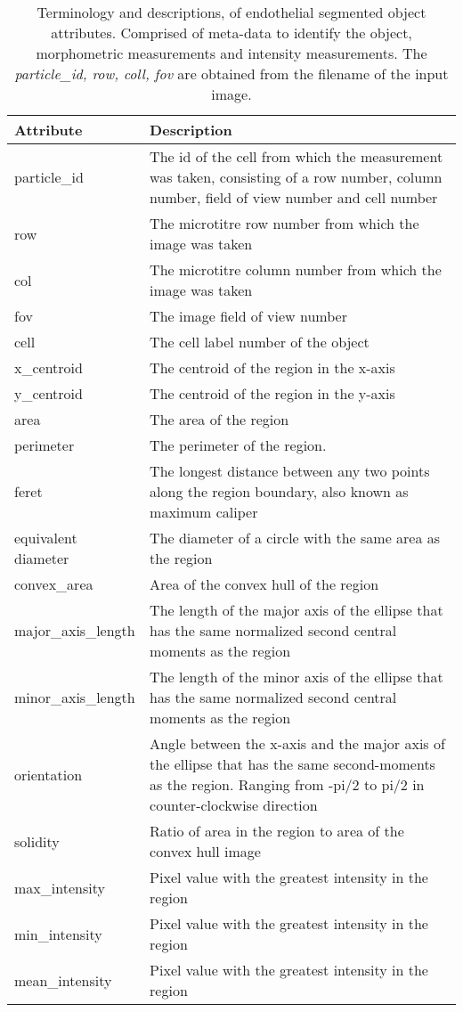 \begin{table}[htbp]
\caption[Endothelial morphometry segmented region attributes and properties]{Terminology and descriptions, of endothelial segmented object attributes. Comprised of meta-data to identify the object, morphometric measurements and intensity measurements. The \emph{particle\_id, row, coll, fov} are obtained from the filename of the input image.}
\centering
\label{table:endothelial_morphometry:region_properties}
\begin{tabular}{p{4cm} p{10cm}}
    \toprule
    Attribute  & Description \\
    \midrule
    particle\_id        & The id of the cell from which the measurement was taken, consisting of a row number, column number, field of view number and cell number \\
    row                 & The microtitre row number from which the image was taken \\
    col                 & The microtitre column number from which the image was taken \\
    fov                 & The image field of view number \\
    cell                & The cell label number of the object \\
    x\_centroid         & The centroid of the region in the x-axis \\
    y\_centroid         & The centroid of the region in the y-axis \\
    area                & The area of the region \\
    perimeter           & The perimeter of the region. \\
    feret               & The longest distance between any two points along the region boundary, also known as maximum caliper \\
    equivalent diameter & The diameter of a circle with the same area as the region \\
    convex\_area        & Area of the convex hull of the region \\
    major\_axis\_length & The length of the major axis of the ellipse that has the same normalized second central moments as the region \\
    minor\_axis\_length & The length of the minor axis of the ellipse that has the same normalized second central moments as the region \\
    orientation         & Angle between the x-axis and the major axis of the ellipse that has the same second-moments as the region. Ranging from -pi/2 to pi/2 in counter-clockwise direction \\
    solidity            & Ratio of area in the region to area of the convex hull image \\
    max\_intensity      & Pixel value with the greatest intensity in the region \\
    min\_intensity      & Pixel value with the greatest intensity in the region \\
    mean\_intensity     & Pixel value with the greatest intensity in the region \\
    \bottomrule
\end{tabular}
\end{table}

